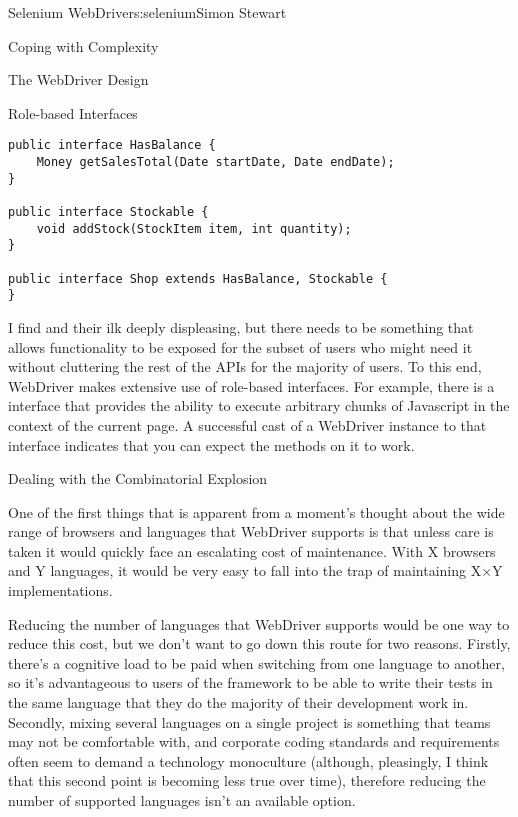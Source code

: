 \begin{aosachapter}{Selenium WebDriver}{s:selenium}{Simon Stewart}
\begin{aosasect1}{Coping with Complexity}
\begin{aosasect2}{The WebDriver Design}
\begin{aosabox}{Role-based Interfaces}
\begin{verbatim}
public interface HasBalance {
    Money getSalesTotal(Date startDate, Date endDate);
}

public interface Stockable {
    void addStock(StockItem item, int quantity);
}

public interface Shop extends HasBalance, Stockable {
}
\end{verbatim}
\end{aosabox}

I find  and their ilk deeply
displeasing, but there needs to be something that allows functionality
to be exposed for the subset of users who might need it without
cluttering the rest of the APIs for the majority of users. To this
end, WebDriver makes extensive use of role-based interfaces. For
example, there is a  interface that provides
the ability to execute arbitrary chunks of Javascript in the context
of the current page. A successful cast of a WebDriver instance to that
interface indicates that you can expect the methods on it to work.



\end{aosasect2}

\begin{aosasect2}{Dealing with the Combinatorial Explosion}

One of the first things that is apparent from a moment's thought about
the wide range of browsers and languages that WebDriver supports is
that unless care is taken it would quickly face an escalating cost of
maintenance. With X browsers and Y languages, it would be very easy to
fall into the trap of maintaining X${\times}$Y implementations.

Reducing the number of languages that WebDriver supports would be one
way to reduce this cost, but we don't want to go down this route for
two reasons. Firstly, there's a cognitive load to be paid when
switching from one language to another, so it's advantageous to users
of the framework to be able to write their tests in the same language
that they do the majority of their development work in. Secondly,
mixing several languages on a single project is something that teams
may not be comfortable with, and corporate coding standards and
requirements often seem to demand a technology monoculture (although,
pleasingly, I think that this second point is becoming less true over
time), therefore reducing the number of supported languages isn't an
available option.


\end{aosasect2}
\end{aosasect1}
\end{aosachapter}

